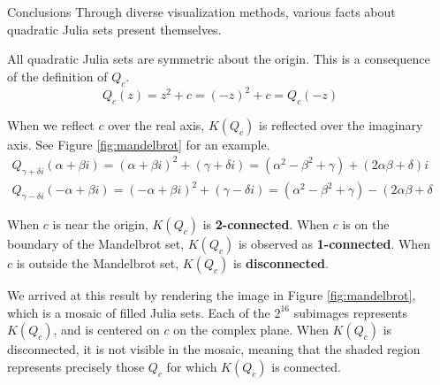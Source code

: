 \documentclass[final]{beamer}
\newlength{\sepwidth}
\newlength{\colwidth}
\newcommand{\separatorcolumn}{\begin{column}{\sepwidth}\end{column}}
\begin{document}
\begin{frame}[t]
\begin{columns}[t]
\separatorcolumn

\begin{column}{\colwidth}
	\begin{block}{Conclusions}
		Through diverse visualization methods, various facts about
		quadratic Julia sets present themselves.

		All quadratic Julia sets are symmetric about the origin.
		This is a consequence of the definition of $Q_c$. \[
			Q_c(z) = z^2 + c = (-z)^2 + c = Q_c(-z)
		\]

		When we reflect $c$ over the real axis, $K(Q_c)$
		is reflected over the imaginary axis.
		See Figure \ref{fig:mandelbrot} for an example.
		\begin{gather*}
			Q_{\gamma + \delta i}(\alpha + \beta i) = (\alpha + \beta i)^2 + (\gamma + \delta i) = (\alpha^2 - \beta^2 + \gamma) + (2\alpha \beta + \delta)i \\
			Q_{\gamma - \delta i}(-\alpha + \beta i) = (-\alpha + \beta i)^2 + (\gamma - \delta i) = (\alpha^2 - \beta^2 + \gamma) - (2\alpha \beta + \delta)i
		\end{gather*}

		When $c$ is near the origin, $K(Q_c)$
		is \textbf{2-connected}.
		When $c$ is on the boundary of the Mandelbrot set,
		$K(Q_c)$ is observed as \textbf{1-connected}.
		When $c$ is outside the Mandelbrot set,
		$K(Q_c)$ is \textbf{disconnected}.

		We arrived at this result by rendering the image in Figure \ref{fig:mandelbrot},
		which is a mosaic of filled Julia sets.
		Each of the $2^{16}$ subimages represents $K(Q_c)$,
		and is centered on $c$ on the complex plane.
		When $K(Q_c)$ is disconnected, it is not visible in the mosaic,
		meaning that the shaded region represents precisely those $Q_c$
		for which $K(Q_c)$ is connected.


\end{block}
\end{column}
\end{columns}
\end{frame}
\end{document}
